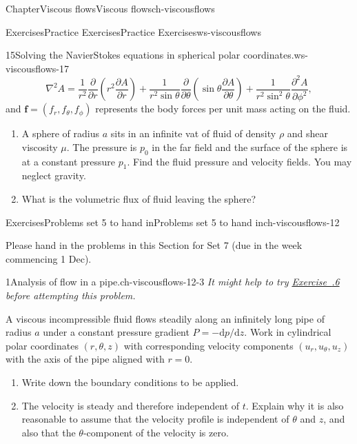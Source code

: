 \documentclass[oneside,10pt,]{book}
\newcommand{\xreffont}{\relax}
\numberwithin{equation}{section}
\newcommand{\de}{\mathrm{d}}
\newcommand{\pd}[2]{\frac{\partial#1}{\partial#2}}
\renewcommand{\bf}{\boldsymbol{f}}
\begin{document}
\begin{chapterptx}{Chapter}{Viscous flows}{}{Viscous flows}{}{}{ch-viscousflows}
\begin{exercises-section}{Exercises}{Practice Exercises}{}{Practice Exercises}{}{}{ws-viscousflows}
\begin{divisionexercise}{15}{Solving the Navier\textendash{}Stokes equations in spherical polar coordinates.}{}{ws-viscousflows-17}
\begin{equation*}
\nabla^2A=\frac1{r^2}\pd{}{r}\left(r^2\pd{A}{r}\right)+\frac1{r^2\sin\theta}\pd{}{\theta}\left(\sin\theta\pd{A}{\theta}\right)+\frac1{r^2\sin^2\theta}\pd{^2A}{\phi^2},
\end{equation*}
and \(\bf=(f_r,f_\theta,f_\phi)\) represents the body forces per unit mass acting on the fluid.%
\begin{enumerate}[font=\bfseries,label=(\alph*),ref=\alph*]%
\item{}A sphere of radius \(a\) sits in an infinite vat of fluid of density \(\rho\) and shear viscosity \(\mu\). The pressure is \(p_0\) in the far field and the surface of the sphere is at a constant pressure \(p_1\). Find the fluid pressure and velocity fields. You may neglect gravity.%
\item{}What is the volumetric flux of fluid leaving the sphere?%
\end{enumerate}%
\end{divisionexercise}%
\end{exercises-section}
%
%
\typeout{************************************************}
\typeout{************************************************}
%
\begin{exercises-section}{Exercises}{Problems set 5 to hand in}{}{Problems set 5 to hand in}{}{}{ch-viscousflows-12}
\begin{introduction}{}%
Please hand in the problems in this Section for Set 7 (due in the week commencing 1 Dec).%
\end{introduction}%
\begin{divisionexercise}{1}{Analysis of flow in a pipe.}{}{ch-viscousflows-12-3}%
\emph{It might help to try \hyperlink{ex-channel-flow}{Exercise~{\xreffont 6.9.6}} before attempting this problem.}%
 \par
A viscous incompressible fluid flows steadily along an infinitely long pipe of radius \(a\) under a constant pressure gradient \(P=-\de p/\de z\). Work in cylindrical polar coordinates \((r,\theta,z)\) with corresponding velocity components \((u_r,u_\theta,u_z)\) with the axis of the pipe aligned with \(r=0\).%
\begin{enumerate}[font=\bfseries,label=(\alph*),ref=\alph*]%
\item{}Write down the boundary conditions to be applied.%
\item{}The velocity is steady and therefore independent of \(t\). Explain why it is also reasonable to assume that the velocity profile is independent of \(\theta\) and \(z\), and also that the \(\theta\)-component of the velocity is zero.%

\end{enumerate}
\end{divisionexercise}
\end{exercises-section}
\end{chapterptx}
\end{document}
